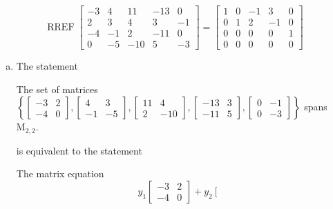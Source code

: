\begin{exerciseAnswer} 


\[\operatorname{RREF} \left[\begin{array}{ccccc}
-3 & 4 & 11 & -13 & 0 \\
2 & 3 & 4 & 3 & -1 \\
-4 & -1 & 2 & -11 & 0 \\
0 & -5 & -10 & 5 & -3
\end{array}\right] = \left[\begin{array}{ccccc}
1 & 0 & -1 & 3 & 0 \\
0 & 1 & 2 & -1 & 0 \\
0 & 0 & 0 & 0 & 1 \\
0 & 0 & 0 & 0 & 0
\end{array}\right] \]


\begin{enumerate}[(a)]
\item The statement 
\begin{center}\begin{minipage}{0.8\textwidth}
 The set of matrices \( \left\{ \left[\begin{array}{cc}
-3 & 2 \\
-4 & 0
\end{array}\right] , \left[\begin{array}{cc}
4 & 3 \\
-1 & -5
\end{array}\right] , \left[\begin{array}{cc}
11 & 4 \\
2 & -10
\end{array}\right] , \left[\begin{array}{cc}
-13 & 3 \\
-11 & 5
\end{array}\right] , \left[\begin{array}{cc}
0 & -1 \\
0 & -3
\end{array}\right] \right\} \) spans \(\mathrm{M}_{2,2}\). 
\end{minipage}\end{center}
     is equivalent to the statement 
\begin{center}\begin{minipage}{0.8\textwidth}
 The matrix equation \[ y_{1} \left[\begin{array}{cc}
-3 & 2 \\
-4 & 0
\end{array}\right] + y_{2} \left[\begin{array}{cc}

\end{array}\]
\end{minipage}
\end{center}
\end{enumerate}
\end{exerciseAnswer}
